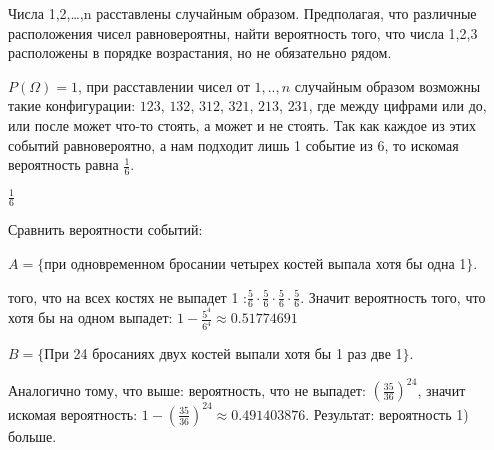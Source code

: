 \medskip
\begin{task}{3}
Числа 1,2,\ldots,n расставлены случайным образом. Предполагая, что различные 
расположения чисел равновероятны, найти вероятность того, что числа 1,2,3 расположены в порядке
возрастания, но не обязательно рядом.
\end{task}

\begin{solution}
$P(\Omega) = 1$, при расставлении чисел от $1,..,n$ случайным образом возможны такие 
конфигурации: $123$, $132$, $312$, $321$, $213$, $231$, где между цифрами или до, или после может что-то стоять,
а может и не стоять. Так как каждое из этих событий равновероятно, а нам подходит лишь 1 событие
из 6, то искомая вероятность равна $\frac{1}{6}$.
\end{solution}

\begin{result}
$\frac{1}{6}$
\end{result}


\medskip
\begin{task}{6}
Сравнить вероятности событий:
\end{task}


\begin{subtask}{1}
$A = \{$при одновременном бросании четырех костей выпала хотя бы одна 1$\}$.
\end{subtask}

\begin{solution}
 того, что на всех костях не выпадет 1 :$\frac{5}{6} \cdot \frac{5}{6} \cdot \frac{5}{6} \cdot
\frac{5}{6}$. Значит вероятность того, что хотя бы на одном выпадет: $1 - \frac{5^4}{6^4} \approx 0.51774691$
\end{solution}


\begin{subtask}{2}
$B = \{$При 24 бросаниях двух костей выпали хотя бы 1 раз две 1$\}$.
\end{subtask}

\begin{solution}
Аналогично тому, что выше: вероятность, что не выпадет: $\left(\frac{35}{36}\right)^{24}$,
значит искомая вероятность: $1 - \left(\frac{35}{36}\right)^{24} \approx 0.491403876$. Результат:
вероятность 1) больше.
\end{solution}


